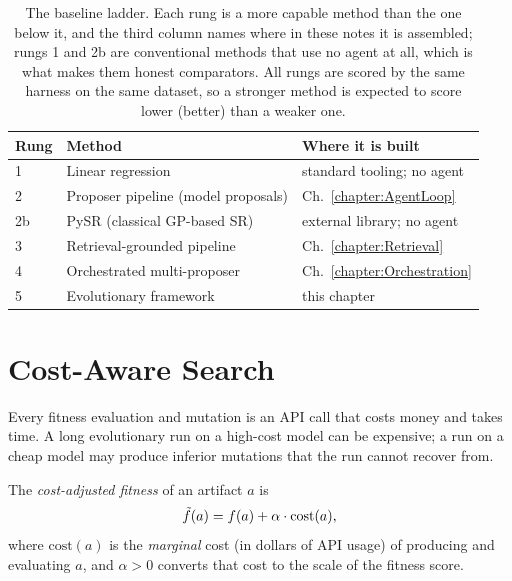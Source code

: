 \begin{table}[htb!]
\begin{center}
\begin{tabular}{lll}
\toprule
\textbf{Rung} & \textbf{Method} & \textbf{Where it is built} \\
\midrule
1 & Linear regression & standard tooling; no agent \\
2 & Proposer pipeline (model proposals) & Ch.~\ref{chapter:AgentLoop} \\
2b & PySR (classical GP-based SR) & external library; no agent \\
3 & Retrieval-grounded pipeline & Ch.~\ref{chapter:Retrieval} \\
4 & Orchestrated multi-proposer & Ch.~\ref{chapter:Orchestration} \\
5 & Evolutionary framework & this chapter \\
\bottomrule
\end{tabular}
\caption{The baseline ladder.
Each rung is a more capable method than the one below it, and the third column names where in these notes it is assembled; rungs 1 and 2b are conventional methods that use no agent at all, which is what makes them honest comparators.
All rungs are scored by the same harness on the same dataset, so a stronger method is expected to score lower (better) than a weaker one.}
\label{table:BaselineLadder}
\end{center}
\end{table}

\section{Cost-Aware Search}
\label{section:CostAwareSearch}

Every fitness evaluation and mutation is an API call that costs money and takes time.
A long evolutionary run on a high-cost model can be expensive; a run on a cheap model may produce inferior mutations that the run cannot recover from.

\begin{definition}
The \emph{cost-adjusted fitness} of an artifact $a$ is
\begin{equation}
\tilde{f}(a) = f(a) + \alpha \cdot \mathrm{cost}(a) ,
\label{equation:CostAdjustedFitness}
\end{equation}
where $\mathrm{cost}(a)$ is the \emph{marginal} cost (in dollars of API usage) of producing and evaluating $a$, and $\alpha > 0$ converts that cost to the scale of the fitness score.
\end{definition}

